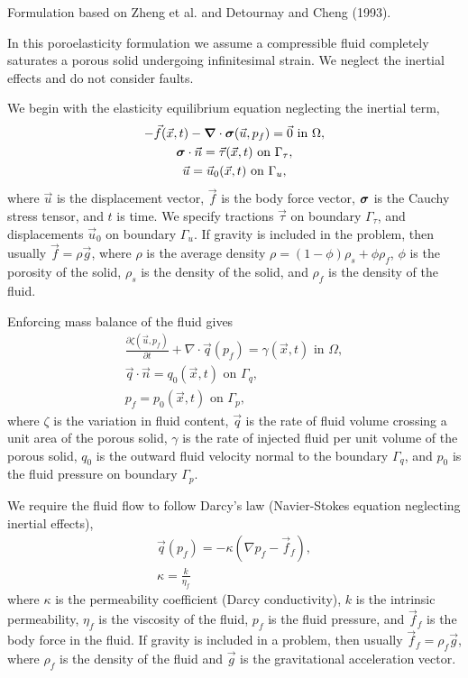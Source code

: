 Formulation based on Zheng et al. and Detournay and Cheng (1993).

In this poroelasticity formulation we assume a compressible fluid
completely saturates a porous solid undergoing infinitesimal
strain. We neglect the inertial effects and do not consider faults.

We begin with the elasticity equilibrium equation neglecting the inertial term,
\begin{gather}
  - \vec{f}(\vec{x},t) - \tensor{\nabla} \cdot \tensor{\sigma}(\vec{u},p_f) = \vec{0} 
\text{ in }\Omega, \\
%
  \tensor{\sigma} \cdot \vec{n} = \vec{\tau}(\vec{x},t) \text{ on }\Gamma_\tau, \\
%
  \vec{u} = \vec{u}_0(\vec{x},t) \text{ on }\Gamma_u,
\end{gather}
where $\vec{u}$ is the displacement vector, $\vec{f}$ is the body
force vector, $\bm{\sigma}$ is the Cauchy stress tensor, and $t$
is time. We specify tractions $\vec{\tau}$ on boundary $\Gamma_\tau$, and
displacements $\vec{u}_0$ on boundary $\Gamma_u$. If gravity is included in
the problem, then usually $\vec{f} = \rho \vec{g}$, where $\rho$ is
the average density $\rho = (1-\phi)\rho_s + \phi \rho_f$, $\phi$ is
the porosity of the solid, $\rho_s$ is the density of the solid, and
$\rho_f$ is the density of the fluid.

Enforcing mass balance of the fluid gives
\begin{gather}
  \frac{\partial \zeta(\vec{u},p_f)}{\partial t} + \nabla \cdot \vec{q}(p_f) = 
\gamma(\vec{x},t) \text{ in }
\Omega, \\
%
  \vec{q} \cdot \vec{n} = q_0(\vec{x},t) \text{ on }\Gamma_q, \\
%
  p_f = p_0(\vec{x},t) \text{ on }\Gamma_p,
\end{gather}
where $\zeta$ is the variation in fluid content, $\vec{q}$ is the rate
of fluid volume crossing a unit area of the porous solid, $\gamma$ is
the rate of injected fluid per unit volume of the porous solid, $q_0$
is the outward fluid velocity normal to the boundary $\Gamma_q$, and
$p_0$ is the fluid pressure on boundary $\Gamma_p$.

We require the fluid flow to follow Darcy's law (Navier-Stokes equation neglecting inertial 
effects),
\begin{gather}
  \vec{q}(p_f) = -\kappa (\nabla p_f - \vec{f}_f), \\
%
  \kappa = \frac{k}{\eta_f}
\end{gather}
where $\kappa$ is the permeability coefficient (Darcy conductivity),
$k$ is the intrinsic permeability, $\eta_f$ is the viscosity of the
fluid, $p_f$ is the fluid pressure, and $\vec{f}_f$ is the body force
in the fluid. If gravity is included in a problem, then usually
$\vec{f}_f = \rho_f \vec{g}$, where $\rho_f$ is the density of the
fluid and $\vec{g}$ is the gravitational acceleration vector.

